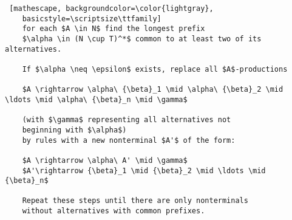 \documentclass[
    border=0.2cm,
    convert={density=600}
]{standalone}
\begin{document}
\begin{lstlisting} [mathescape, backgroundcolor=\color{lightgray},
	basicstyle=\scriptsize\ttfamily]
	for each $A \in N$ find the longest prefix
	$\alpha \in (N \cup T)^*$ common to at least two of its alternatives.
	
	If $\alpha \neq \epsilon$ exists, replace all $A$-productions
	
	$A \rightarrow \alpha\ {\beta}_1 \mid \alpha\ {\beta}_2 \mid \ldots \mid \alpha\ {\beta}_n \mid \gamma$
	
	(with $\gamma$ representing all alternatives not
	beginning with $\alpha$)
	by rules with a new nonterminal $A'$ of the form:
	
	$A \rightarrow \alpha\ A' \mid \gamma$
	$A'\rightarrow {\beta}_1 \mid {\beta}_2 \mid \ldots \mid {\beta}_n$
	
	Repeat these steps until there are only nonterminals
	without alternatives with common prefixes.
\end{lstlisting}
\end{document}
